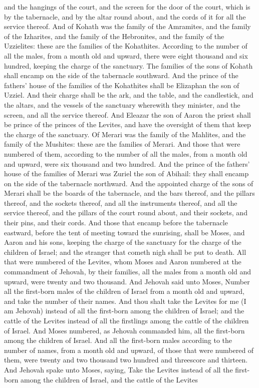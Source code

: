 and the hangings of the court, and the screen for the door of the court, which is by the tabernacle, and by the altar round about, and the cords of it for all the service thereof.  And of Kohath was the family of the Amramites, and the family of the Izharites, and the family of the Hebronites, and the family of the Uzzielites: these are the families of the Kohathites. According to the number of all the males, from a month old and upward, there were eight thousand and six hundred, keeping the charge of the sanctuary. The families of the sons of Kohath shall encamp on the side of the tabernacle southward. And the prince of the fathers’ house of the families of the Kohathites shall be Elizaphan the son of Uzziel. And their charge shall be the ark, and the table, and the candlestick, and the altars, and the vessels of the sanctuary wherewith they minister, and the screen, and all the service thereof. And Eleazar the son of Aaron the priest shall be prince of the princes of the Levites, and have the oversight of them that keep the charge of the sanctuary.  Of Merari was the family of the Mahlites, and the family of the Mushites: these are the families of Merari. And those that were numbered of them, according to the number of all the males, from a month old and upward, were six thousand and two hundred. And the prince of the fathers’ house of the families of Merari was Zuriel the son of Abihail: they shall encamp on the side of the tabernacle northward. And the appointed charge of the sons of Merari shall be the boards of the tabernacle, and the bars thereof, and the pillars thereof, and the sockets thereof, and all the instruments thereof, and all the service thereof, and the pillars of the court round about, and their sockets, and their pins, and their cords.  And those that encamp before the tabernacle eastward, before the tent of meeting toward the sunrising, shall be Moses, and Aaron and his sons, keeping the charge of the sanctuary for the charge of the children of Israel; and the stranger that cometh nigh shall be put to death. All that were numbered of the Levites, whom Moses and Aaron numbered at the commandment of Jehovah, by their families, all the males from a month old and upward, were twenty and two thousand.  And Jehovah said unto Moses, Number all the first-born males of the children of Israel from a month old and upward, and take the number of their names. And thou shalt take the Levites for me (I am Jehovah) instead of all the first-born among the children of Israel; and the cattle of the Levites instead of all the firstlings among the cattle of the children of Israel. And Moses numbered, as Jehovah commanded him, all the first-born among the children of Israel. And all the first-born males according to the number of names, from a month old and upward, of those that were numbered of them, were twenty and two thousand two hundred and threescore and thirteen.  And Jehovah spake unto Moses, saying, Take the Levites instead of all the first-born among the children of Israel, and the cattle of the Levites 